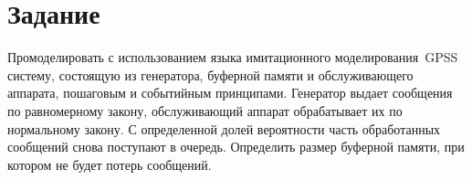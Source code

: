 \chapter{Задание}

Промоделировать с использованием языка имитационного моделирования~GPSS систему,
состоящую из генератора, буферной памяти и обслуживающего аппарата, пошаговым и
событийным принципами. Генератор выдает сообщения по равномерному закону,
обслуживающий аппарат обрабатывает их по нормальному закону.  С определенной
долей вероятности часть обработанных сообщений снова поступают в очередь.
Определить размер буферной памяти, при котором не будет потерь сообщений.


